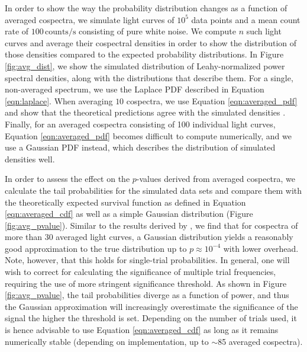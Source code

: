 \documentclass[12pt]{emulateapj}
\begin{document}
In order to show the way the probability distribution changes as a function of averaged cospectra, we simulate light curves of $10^{5}$ data points and a mean count rate of $100\,\mathrm{counts}/\mathrm{s}$ consisting of pure white noise. We compute $n$ such light curves and average their cospectral densities in order to show the distribution of those densities compared to the expected probability distributions. In Figure \ref{fig:avg_dist}, we show the simulated distribution of Leahy-normalized power spectral densities, along with the distributions that describe them. For a single, non-averaged spectrum, we use the Laplace PDF described in Equation \ref{eqn:laplace}. When averaging $10$ cospectra, we use Equation \ref{eqn:averaged_pdf} and show that the theoretical predictions agree with the simulated densities . Finally, for an averaged cospectra consisting of 100 individual light curves, Equation \ref{eqn:averaged_pdf} becomes difficult to compute numerically, and we use a Gaussian PDF instead, which describes the distribution of simulated densities well. 

In order to assess the effect on the $p$-values derived from averaged cospectra, we calculate the tail probabilities for the simulated data sets and compare them with the theoretically expected survival function as defined in Equation \ref{eqn:averaged_cdf} as well as a simple Gaussian distribution (Figure \ref{fig:avg_pvalue}). Similar to the results derived by \citet{balakrishnan1986}, we find that for cospectra of more than 30 averaged light curves, a Gaussian distribution yields a reasonably good approximation to the true distribution up to $p \approx 10^{-4}$ with lower overhead. Note, however, that this holds for single-trial probabilities. In general, one will wish to correct for calculating the significance of multiple trial frequencies, requiring the use of more stringent significance threshold. As shown in Figure \ref{fig:avg_pvalue}, the tail probabilities diverge as a function of power, and thus the Gaussian approximation will increasingly overestimate the significance of the signal the higher the threshold is set. Depending on the number of trials used, it is hence advisable to use Equation \ref{eqn:averaged_cdf} as long as it remains numerically stable (depending on implementation, up to $\sim$85 averaged cospectra).
\end{document}
